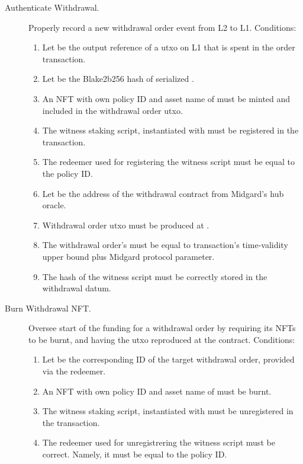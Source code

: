 \documentclass[../midgard.tex]{subfiles}
\begin{document}
\begin{description}
  \item[Authenticate Withdrawal.] Properly record a new withdrawal order event from L2 to L1.
    Conditions:
      \begin{enumerate}
        \item Let  be the output reference of a utxo on L1 that is spent in the order transaction.
        \item Let  be the Blake2b256 hash of serialized .
        \item An NFT with own policy ID and asset name of  must be minted and included in the withdrawal order utxo.
        \item The witness staking script, instantiated with  must be registered in the transaction.
        \item The redeemer used for registering the witness script must be equal to the  policy ID.
        \item Let  be the address of the withdrawal contract from Midgard's hub oracle.
        \item Withdrawal order utxo must be produced at .
        \item The withdrawal order's  must be equal to transaction's time-validity upper bound plus  Midgard protocol parameter.
        \item The hash of the witness script must be correctly stored in the withdrawal datum.
      \end{enumerate}
    \item[Burn Withdrawal NFT.] Oversee start of the funding for a withdrawal order by requiring its NFTs to be burnt, and having the utxo reproduced at the  contract.
    Conditions:
      \begin{enumerate}
        \item Let  be the corresponding ID of the target withdrawal order, provided via the redeemer.
        \item An NFT with own policy ID and asset name of  must be burnt.
        \item The witness staking script, instantiated with  must be unregistered in the transaction.
        \item The redeemer used for unregistrering the witness script must be correct. Namely, it must be equal to the  policy ID.
      \end{enumerate}
\end{description}
\end{document}

